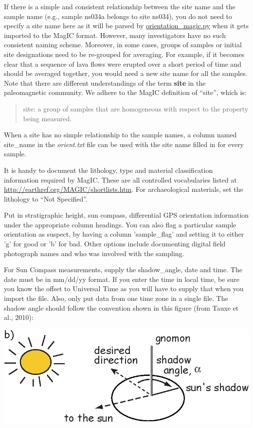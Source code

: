 \documentclass[11pt]{book}
\begin{document}
{ If there is a simple  and consistent relationship between the site name and the sample name (e.g., sample ns034a belongs to site ns034), you do not need to specify a site name here as it will be parsed by \href{#orientation_magic.py}{orientation\_magic.py} when it gets imported to the MagIC format.  However, many investigators have no such consistent naming scheme.  Moreover, in some cases,  groups of samples or initial site designations need to be re-grouped for averaging.  For example, if it becomes clear that a sequence of lava flows were erupted over a short period of time and should be averaged together, you would need a new site name for all the samples.  Note that there are different understandings of the term {\bf site} in the paleomagnetic community.  We adhere to the MagIC definition of ``site'', which is: 
 \begin{quote}
site: a group of samples that are homogeneous with respect to the property being measured. 
\end{quote}
\noindent When a site  has no simple relationship to the sample names, a column named  site\_name in the {\it orient.txt} file can be used  with the site name filled in for every sample.  
 
   It is handy  to document the lithology, type and material classification information required by MagIC. These  are all controlled vocabularies listed at \url{http://earthref.org/MAGIC/shortlists.htm}.   For archaeological materials, set the lithology to ``Not Specified''.   
   
   Put in stratigraphic height, sun compass, differential GPS orientation information under the appropriate column headings.  You can also flag a particular sample orientation as suspect, by having a column 'sample\_flag' and setting it to either 'g' for good or 'b' for bad.  Other options include documenting digital field photograph names and who was involved with the sampling.  
 
 For Sun Compass measurements, supply the shadow\_angle, date and time. The date must be in mm/dd/yy format. If you enter the time in local time, be sure you know the offset to Universal Time as you will have to supply that when you import the file. Also, only put data from one time zone in a single file. The shadow angle should follow the convention shown in this figure (from Tauxe et al., 2010): \nocite{tauxe10}
 
  \includegraphics[width=15cm]{EPSfiles/suncomp.eps}
  
}
\end{document}
